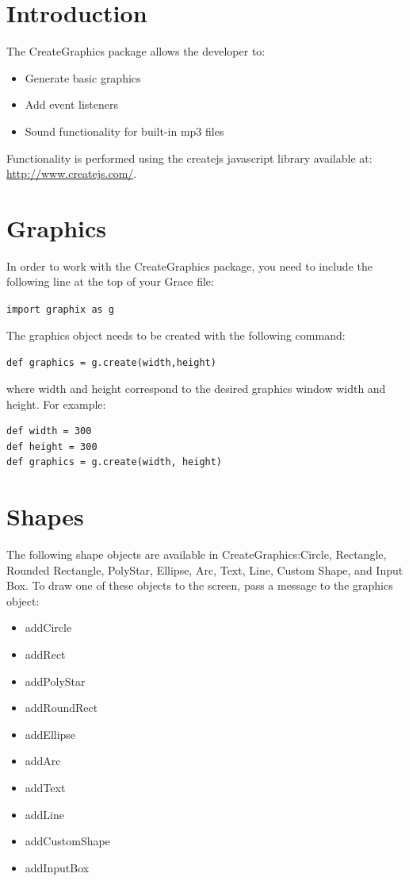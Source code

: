 \documentclass{article}
\begin{document}
\section{Introduction}
The CreateGraphics package allows the developer to:

\begin{itemize}
\item Generate basic graphics
\item Add event listeners
\item Sound functionality for built-in mp3 files
\end{itemize}

Functionality is performed using the createjs javascript library available at:\\
\url{http://www.createjs.com/}. 

\section{Graphics}
In order to work with the CreateGraphics package, you need to include the 
following line at the top of your Grace file:

\texttt{import graphix as g}

The graphics object needs to be created with the following command:

\texttt{def graphics = g.create(width,height)} 

where width and height correspond to the desired graphics window width
and height. For example:

\begin{lstlisting}
def width = 300
def height = 300
def graphics = g.create(width, height)
\end{lstlisting}

\section{Shapes}
The following shape objects are available in CreateGraphics:Circle, Rectangle, Rounded Rectangle, PolyStar, Ellipse, Arc, Text, Line, Custom Shape, and Input Box.
To draw one of these objects to the screen, pass a message to the graphics object:

\begin{itemize}
\item addCircle
\item addRect
\item addPolyStar
\item addRoundRect
\item addEllipse
\item addArc
\item addText
\item addLine
\item addCustomShape
\item addInputBox
\end{itemize}
\end{document}
